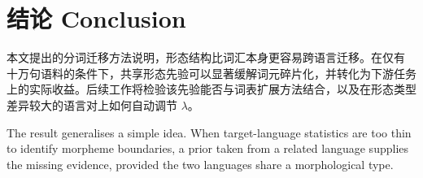 \section{结论 Conclusion}
\label{sec:conclusion}

本文提出的分词迁移方法说明，形态结构比词汇本身更容易跨语言迁移。在仅有
十万句语料的条件下，共享形态先验可以显著缓解词元碎片化，并转化为下游任务
上的实际收益。后续工作将检验该先验能否与词表扩展方法结合，以及在形态类型
差异较大的语言对上如何自动调节 $\lambda$。

The result generalises a simple idea. When target-language statistics are too
thin to identify morpheme boundaries, a prior taken from a related language
supplies the missing evidence, provided the two languages share a morphological
type.
